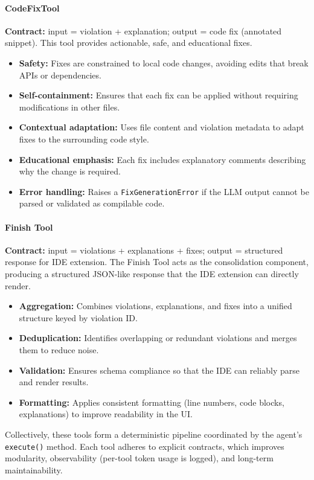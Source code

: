 \begin{spacing}{1.2}
\paragraph{CodeFixTool}
\textbf{Contract:} input = violation + explanation; output = code fix (annotated snippet).  
This tool provides actionable, safe, and educational fixes.
\begin{itemize}
    \item \textbf{Safety:} Fixes are constrained to local code changes, avoiding edits that break APIs or dependencies.
    \item \textbf{Self-containment:} Ensures that each fix can be applied without requiring modifications in other files.
    \item \textbf{Contextual adaptation:} Uses file content and violation metadata to adapt fixes to the surrounding code style.
    \item \textbf{Educational emphasis:} Each fix includes explanatory comments describing why the change is required.
    \item \textbf{Error handling:} Raises a \texttt{FixGenerationError} if the LLM output cannot be parsed or validated as compilable code.
\end{itemize}

\paragraph{Finish Tool}
\textbf{Contract:} input = violations + explanations + fixes; output = structured response for IDE extension.  
The Finish Tool acts as the consolidation component, producing a structured JSON-like response that the IDE extension can directly render.
\begin{itemize}
    \item \textbf{Aggregation:} Combines violations, explanations, and fixes into a unified structure keyed by violation ID.
    \item \textbf{Deduplication:} Identifies overlapping or redundant violations and merges them to reduce noise.
    \item \textbf{Validation:} Ensures schema compliance so that the IDE can reliably parse and render results.
    \item \textbf{Formatting:} Applies consistent formatting (line numbers, code blocks, explanations) to improve readability in the UI.
\end{itemize}

\noindent Collectively, these tools form a deterministic pipeline coordinated by the agent’s \texttt{execute()} method. Each tool adheres to explicit contracts, which improves modularity, observability (per-tool token usage is logged), and long-term maintainability.



\end{spacing}
